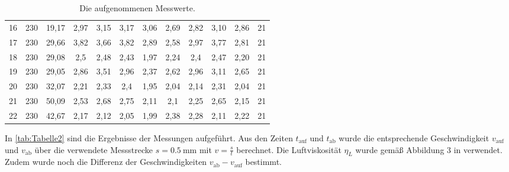 \begin{landscape}
\begin{table}[!ht]
\begin{tabular}{c c c c c c c c c c c c}
            16&        230 & 19,17 &                      2,97 &                      3,15 &                      3,17 &                3,06 &                2,69 &                2,82 &                                               3,10 &       2,86 &                 21 \\
            17&        230 & 29,66 &                      3,82 &                      3,66 &                      3,82 &                2,89 &                2,58 &                2,97 &                                               3,77 &       2,81 &                 21 \\
            18&        230 & 29,08 &                       2,5 &                      2,48 &                      2,43 &                1,97 &                2,24 &                 2,4 &                                               2,47 &       2,20 &                 21 \\
            19&        230 & 29,05 &                      2,86 &                      3,51 &                      2,96 &                2,37 &                2,62 &                2,96 &                                               3,11 &       2,65 &                 21 \\
            20&        230 & 32,07 &                      2,21 &                      2,33 &                       2,4 &                1,95 &                2,04 &                2,14 &                                               2,31 &       2,04 &                 21 \\
            21&        230 & 50,09 &                      2,53 &                      2,68 &                      2,75 &                2,11 &                 2,1 &                2,25 &                                               2,65 &       2,15 &                 21 \\
            22&        230 & 42,67 &                      2,17 &                      2,12 &                      2,05 &                1,99 &                2,38 &                2,28 &                                               2,11 &       2,22 &                 21 \\
        \bottomrule
        \end{tabular}
        \caption{Die aufgenommenen Messwerte.}
        \label{tab:Messwerte}
    \end{table}
\end{landscape}

In \ref{tab:Tabelle2} sind die Ergebnisse der Messungen aufgeführt. Aus den Zeiten $t_{\text{auf}}$ und $t_{\text{ab}}$ 
wurde die entsprechende Geschwindigkeit $v_{\text{auf}}$ und $v_{\text{ab}}$ über die verwendete Messstrecke $s = \SI{0.5}{\mm}$
mit $v=\frac{s}{t}$ berechnet. Die Luftviskosität $\eta_{L}$ wurde gemäß Abbildung 3 in \cite{1} verwendet. Zudem wurde noch die  
Differenz der Geschwindigkeiten $v_{\text{ab}} - v_{\text{auf}}$ bestimmt.

